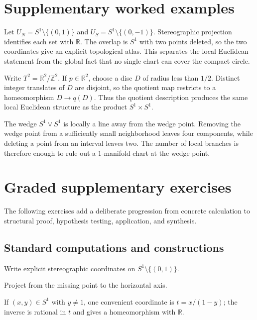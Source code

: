 \section{Supplementary worked examples}
\label{sec:vii01-pedagogy}

\begin{example}\label{ex:vii01-ped-01}
Let \(U_N=S^1\setminus\{(0,1)\}\) and \(U_S=S^1\setminus\{(0,-1)\}\).  Stereographic projection identifies each set with \(\mathbb R\).  The overlap is \(S^1\) with two points deleted, so the two coordinates give an explicit topological atlas.  This separates the local Euclidean statement from the global fact that no single chart can cover the compact circle.
\end{example}

\begin{example}\label{ex:vii01-ped-02}
Write \(T^2=\mathbb R^2/\mathbb Z^2\).  If \(p\in\mathbb R^2\), choose a disc \(D\) of radius less than \(1/2\).  Distinct integer translates of \(D\) are disjoint, so the quotient map restricts to a homeomorphism \(D\to q(D)\).  Thus the quotient description produces the same local Euclidean structure as the product \(S^1\times S^1\).
\end{example}

\begin{example}\label{ex:vii01-ped-03}
The wedge \(S^1\vee S^1\) is locally a line away from the wedge point.  Removing the wedge point from a sufficiently small neighborhood leaves four components, while deleting a point from an interval leaves two.  The number of local branches is therefore enough to rule out a \(1\)-manifold chart at the wedge point.
\end{example}

\section{Graded supplementary exercises}
The following exercises add a deliberate progression from concrete calculation to structural proof, hypothesis testing, application, and synthesis.

\subsection*{Standard computations and constructions}

\begin{exercise}\label{exr:vii01-ped-01}
Write explicit stereographic coordinates on \(S^1\setminus\{(0,1)\}\).
\end{exercise}
\begin{hint}
Project from the missing point to the horizontal axis.
\end{hint}
\begin{solution}
If \((x,y)\in S^1\) with \(y\neq1\), one convenient coordinate is \(t=x/(1-y)\); the inverse is rational in \(t\) and gives a homeomorphism with \(\mathbb R\).
\end{solution}

